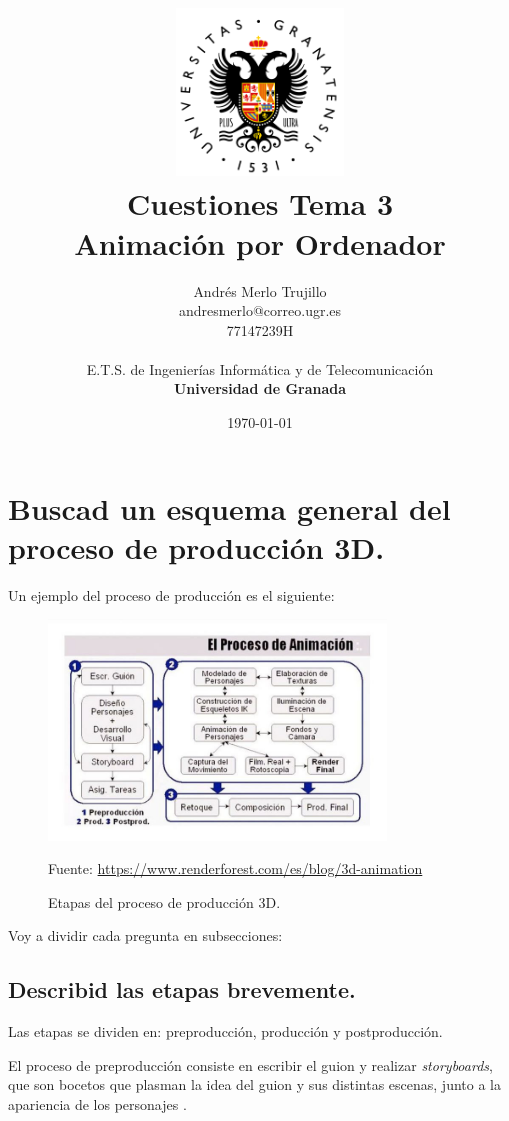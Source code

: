 \documentclass{article}
\title{
\includegraphics[width=1.75in]{imagenes/UGR-Logo.png} \\
\vspace*{1in}
\textbf{Cuestiones Tema 3} \\
Animación por Ordenador \\
\vspace*{0.5in}}
\author{Andrés Merlo Trujillo \\
andresmerlo@correo.ugr.es \\
77147239H \\ 
\vspace*{0.5in} \\
E.T.S. de Ingenierías Informática y de Telecomunicación \\
\textbf{Universidad de Granada}} \date{\today}
\begin{document}
\begin{titlingpage}
\maketitle
\end{titlingpage}

\tableofcontents

\newpage

\pagestyle{fancy}   %

\section{Buscad un esquema general del proceso de producción 3D.}

Un ejemplo del proceso de producción es el siguiente:

\begin{figure}[H]
   \centering
   \includegraphics[width=0.8\textwidth]{imagenes/prod.jpg}
   \caption{Etapas del proceso de producción 3D.}
   \vspace{10pt}
   \footnotesize{Fuente: \url{https://www.renderforest.com/es/blog/3d-animation}}
\end{figure}


Voy a dividir cada pregunta en subsecciones:

\subsection{Describid las etapas brevemente.}
Las etapas se dividen en: preproducción, producción y postproducción.

\bigskip

El proceso de preproducción consiste en escribir el guion y realizar \textit{storyboards}, que son bocetos que plasman la idea del guion y sus distintas escenas, junto a la apariencia de los personajes \cite{diapos}.
\end{document}
